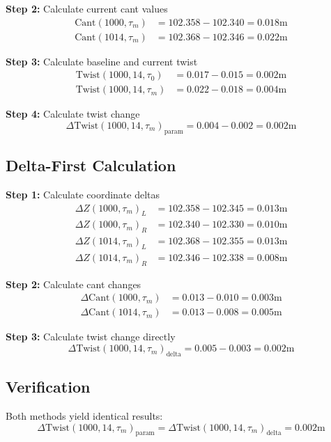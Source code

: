 \documentclass{article}
\begin{document}
\textbf{Step 2:} Calculate current cant values
\begin{align}
\text{Cant}(1000, \tau_m) &= 102.358 - 102.340 = 0.018\text{m} \\
\text{Cant}(1014, \tau_m) &= 102.368 - 102.346 = 0.022\text{m}
\end{align}

\textbf{Step 3:} Calculate baseline and current twist
\begin{align}
\text{Twist}(1000, 14, \tau_0) &= 0.017 - 0.015 = 0.002\text{m} \\
\text{Twist}(1000, 14, \tau_m) &= 0.022 - 0.018 = 0.004\text{m}
\end{align}

\textbf{Step 4:} Calculate twist change
\begin{equation}
\Delta\text{Twist}(1000, 14, \tau_m)_{\text{param}} = 0.004 - 0.002 = 0.002\text{m}
\end{equation}

\subsection{Delta-First Calculation}
\textbf{Step 1:} Calculate coordinate deltas
\begin{align}
\Delta Z(1000, \tau_m)_L &= 102.358 - 102.345 = 0.013\text{m} \\
\Delta Z(1000, \tau_m)_R &= 102.340 - 102.330 = 0.010\text{m} \\
\Delta Z(1014, \tau_m)_L &= 102.368 - 102.355 = 0.013\text{m} \\
\Delta Z(1014, \tau_m)_R &= 102.346 - 102.338 = 0.008\text{m}
\end{align}

\textbf{Step 2:} Calculate cant changes
\begin{align}
\Delta\text{Cant}(1000, \tau_m) &= 0.013 - 0.010 = 0.003\text{m} \\
\Delta\text{Cant}(1014, \tau_m) &= 0.013 - 0.008 = 0.005\text{m}
\end{align}

\textbf{Step 3:} Calculate twist change directly
\begin{equation}
\Delta\text{Twist}(1000, 14, \tau_m)_{\text{delta}} = 0.005 - 0.003 = 0.002\text{m}
\end{equation}

\subsection{Verification}
Both methods yield identical results:
\begin{equation}
\Delta\text{Twist}(1000, 14, \tau_m)_{\text{param}} = \Delta\text{Twist}(1000, 14, \tau_m)_{\text{delta}} = 0.002\text{m}
\end{equation}
\end{document}
